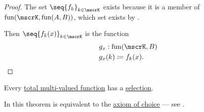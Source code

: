 \begin{proof}
   The set \( \seq{ f_k }_{k \in \mscrK} \) exists because it is a member of \( \fun(\mscrK, \fun(A, B)) \), which set exists by .

   Then \( \seq{ f_k(x) }_{k \in \mscrK} \) is the function
   \begin{equation*}
     \begin{aligned}
       &g_x: \fun(\mscrK, B) \\
       &g_x(k) \coloneqq f_k(x).
     \end{aligned}
   \end{equation*}
\end{proof}

\begin{theorem}\label{thm:existence_of_multi_valued_function_selection}
  Every \hyperref[def:multi_valued_function/total]{total multi-valued function} has a \hyperref[def:function/selection]{selection}.

  In \hyperref[def:zfc]{} this theorem is equivalent to the \hyperref[def:zfc/choice]{axiom of choice} --- see .
\end{theorem}
